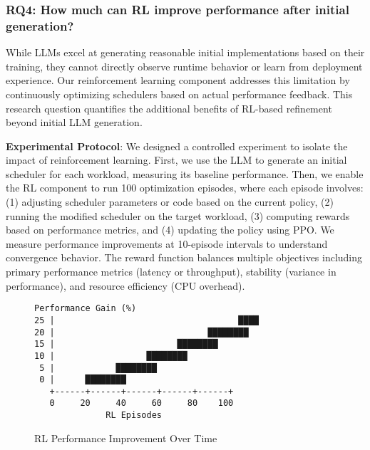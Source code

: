 \subsubsection{RQ4: How much can RL improve performance after initial generation?}

While LLMs excel at generating reasonable initial implementations based on their training, they cannot directly observe runtime behavior or learn from deployment experience. Our reinforcement learning component addresses this limitation by continuously optimizing schedulers based on actual performance feedback. This research question quantifies the additional benefits of RL-based refinement beyond initial LLM generation.

\textbf{Experimental Protocol}: We designed a controlled experiment to isolate the impact of reinforcement learning. First, we use the LLM to generate an initial scheduler for each workload, measuring its baseline performance. Then, we enable the RL component to run 100 optimization episodes, where each episode involves: (1) adjusting scheduler parameters or code based on the current policy, (2) running the modified scheduler on the target workload, (3) computing rewards based on performance metrics, and (4) updating the policy using PPO. We measure performance improvements at 10-episode intervals to understand convergence behavior. The reward function balances multiple objectives including primary performance metrics (latency or throughput), stability (variance in performance), and resource efficiency (CPU overhead).

\begin{figure}[h]
\centering
\caption{RL Performance Improvement Over Time}
\label{fig:rl-improvement}
\begin{verbatim}
Performance Gain (%)
25 |                                    ████
20 |                              ████████
15 |                        ████████
10 |                  ████████
 5 |            ████████
 0 |      ████████
   +------+------+------+------+------+
   0     20     40     60     80    100
              RL Episodes
\end{verbatim}
\end{figure}

